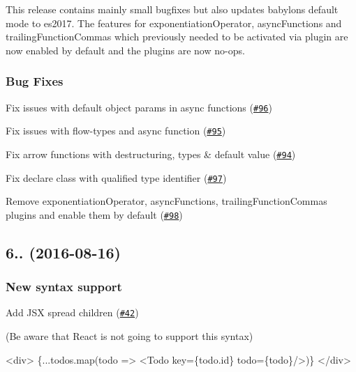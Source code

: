 This release contains mainly small bugfixes but also updates babylons default mode to es2017. The features for {\ttfamily exponentiation\+Operator}, {\ttfamily async\+Functions} and {\ttfamily trailing\+Function\+Commas} which previously needed to be activated via plugin are now enabled by default and the plugins are now no-\/ops.

\subsubsection*{Bug Fixes}


\begin{DoxyItemize}
\item Fix issues with default object params in async functions (\href{https://github.com/babel/babylon/pull/96}{\tt \#96}) 
\item Fix issues with flow-\/types and async function (\href{https://github.com/babel/babylon/pull/95}{\tt \#95}) 
\item Fix arrow functions with destructuring, types \& default value (\href{https://github.com/babel/babylon/pull/94}{\tt \#94}) 
\item Fix declare class with qualified type identifier (\href{https://github.com/babel/babylon/pull/97}{\tt \#97}) 
\item Remove exponentiation\+Operator, async\+Functions, trailing\+Function\+Commas plugins and enable them by default (\href{https://github.com/babel/babylon/pull/98}{\tt \#98}) 
\end{DoxyItemize}

\subsection*{6.. (2016-\/08-\/16)}

\subsubsection*{New syntax support}


\begin{DoxyItemize}
\item Add J\+SX spread children (\href{https://github.com/babel/babylon/pull/42}{\tt \#42}) 
\end{DoxyItemize}

(Be aware that React is not going to support this syntax)


\begin{DoxyCode}
<div>
  \{...todos.map(todo => <Todo key=\{todo.id\} todo=\{todo\}/>)\}
</div>
\end{DoxyCode}



